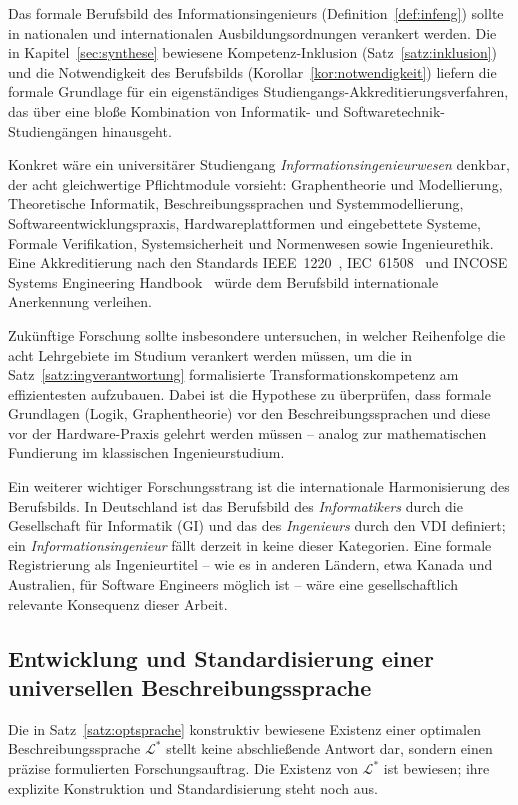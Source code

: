 ﻿\documentclass[a4paper,12pt]{article}
\theoremstyle{definition}
\begin{document}
Das formale Berufsbild des Informationsingenieurs (Definition~\ref{def:infeng}) sollte
in nationalen und internationalen Ausbildungsordnungen verankert werden. Die in Kapitel~\ref{sec:synthese}
bewiesene Kompetenz-Inklusion (Satz~\ref{satz:inklusion}) und die Notwendigkeit des Berufsbilds
(Korollar~\ref{kor:notwendigkeit}) liefern die formale Grundlage für ein eigenständiges
Studiengangs-Akkreditierungsverfahren, das über eine bloße Kombination von Informatik-
und Softwaretechnik-Studiengängen hinausgeht.

Konkret wäre ein universitärer Studiengang \emph{Informationsingenieurwesen} denkbar,
der acht gleichwertige Pflichtmodule vorsieht: Graphentheorie und Modellierung,
Theoretische Informatik, Beschreibungssprachen und Systemmodellierung,
Softwareentwicklungspraxis, Hardwareplattformen und eingebettete Systeme,
Formale Verifikation, Systemsicherheit und Normenwesen sowie Ingenieurethik.
Eine Akkreditierung nach den Standards IEEE~1220~\cite{ieee2021}, IEC~61508~\cite{iec61508}
und INCOSE Systems Engineering Handbook~\cite{incose2015} würde dem Berufsbild
internationale Anerkennung verleihen.

Zukünftige Forschung sollte insbesondere untersuchen, in welcher Reihenfolge die acht
Lehrgebiete im Studium verankert werden müssen, um die in Satz~\ref{satz:ingverantwortung}
formalisierte Transformationskompetenz am effizientesten aufzubauen. Dabei ist die
Hypothese zu überprüfen, dass formale Grundlagen (Logik, Graphentheorie) vor den
Beschreibungssprachen und diese vor der Hardware-Praxis gelehrt werden müssen --
analog zur mathematischen Fundierung im klassischen Ingenieurstudium.

Ein weiterer wichtiger Forschungsstrang ist die internationale Harmonisierung des
Berufsbilds. In Deutschland ist das Berufsbild des \emph{Informatikers} durch die
Gesellschaft für Informatik (GI) und das des \emph{Ingenieurs} durch den VDI
definiert; ein \emph{Informationsingenieur} fällt derzeit in keine dieser Kategorien.
Eine formale Registrierung als Ingenieurtitel -- wie es in anderen Ländern, etwa
Kanada und Australien, für Software Engineers möglich ist -- wäre eine gesellschaftlich
relevante Konsequenz dieser Arbeit.

\subsection{Entwicklung und Standardisierung einer universellen Beschreibungssprache}

Die in Satz~\ref{satz:optsprache} konstruktiv bewiesene Existenz einer optimalen
Beschreibungssprache $\mathcal{L}^*$ stellt keine abschließende Antwort dar, sondern
einen präzise formulierten Forschungsauftrag. Die Existenz von $\mathcal{L}^*$ ist
bewiesen; ihre explizite Konstruktion und Standardisierung steht noch aus.
\end{document}
